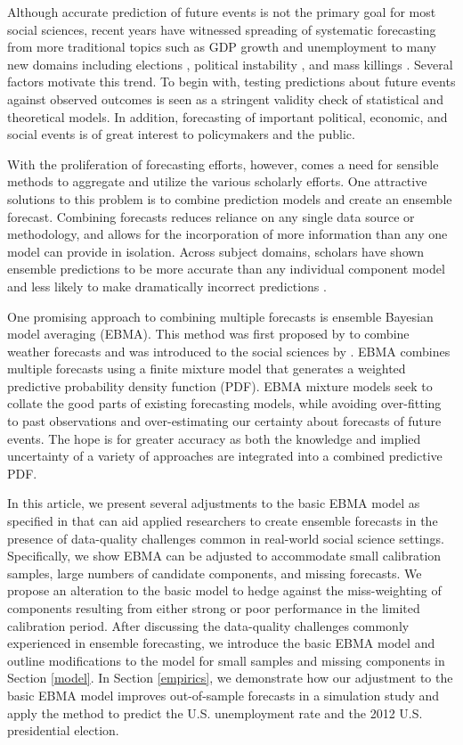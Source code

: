 \documentclass[12pt,fullpage,endnotes]{article}
\begin{document}
Although accurate prediction of future events is not the primary goal
for most social sciences, recent years have witnessed spreading of
systematic forecasting from more traditional topics such as GDP growth
and unemployment to many new domains including elections
\citep[e.g.,][]{Linzer:2013}, political instability
\citep[e.g.,][]{Goldstone:etal:2010}, and mass killings
\citep{Ulfelder:2012}. Several factors motivate this trend. To begin
with, testing predictions about future events against observed
outcomes is seen as a stringent validity check of statistical and
theoretical models. In addition, forecasting of important political,
economic, and social events is of great interest to policymakers and
the public.


With the proliferation of forecasting efforts, however, comes a need
for sensible methods to aggregate and utilize the various scholarly
efforts. One attractive solutions to this problem is to combine
prediction models and create an ensemble forecast. Combining
forecasts reduces reliance on any single data source or methodology,
and allows for the incorporation of more information than any one model can provide in isolation. Across subject domains, scholars have shown
ensemble predictions to be more accurate than any individual component
model and less likely to make dramatically incorrect predictions
\citep{Bates:1969,Armstrong:2001,Raftery:2005}.

One promising approach to combining multiple forecasts is ensemble
Bayesian model averaging (EBMA). This method was first proposed by
\citet{Raftery:2005} to combine weather forecasts and was introduced
to the social sciences by \citet{mhw:2012}. EBMA combines multiple
forecasts using a finite mixture model that generates a weighted
predictive probability density function (PDF). EBMA mixture models
seek to collate the good parts of existing forecasting models, while
avoiding over-fitting to past observations and over-estimating our
certainty about forecasts of future events. The hope is for greater accuracy as both the knowledge and implied uncertainty of a variety of approaches are
integrated into a combined predictive PDF.

In this article, we present several adjustments to the basic EBMA
model as specified in \citet{mhw:2012} that can aid applied
researchers to create ensemble forecasts in the presence of
data-quality challenges common in real-world social science settings.
Specifically, we show EBMA can be adjusted to accommodate small
calibration samples, large numbers of candidate components, and
missing forecasts.  We propose an alteration to the basic model to
hedge against the miss-weighting of components resulting from either
strong or poor performance in the limited calibration period.  After
discussing the data-quality challenges commonly experienced in
ensemble forecasting, we introduce the basic EBMA model and outline
modifications to the model for small samples and missing components in
Section \ref{model}. In Section \ref{empirics}, we demonstrate how our
adjustment to the basic EBMA model improves out-of-sample forecasts in
a simulation study and apply the method to predict the
U.S. unemployment rate and the 2012 U.S. presidential election.
\end{document}
